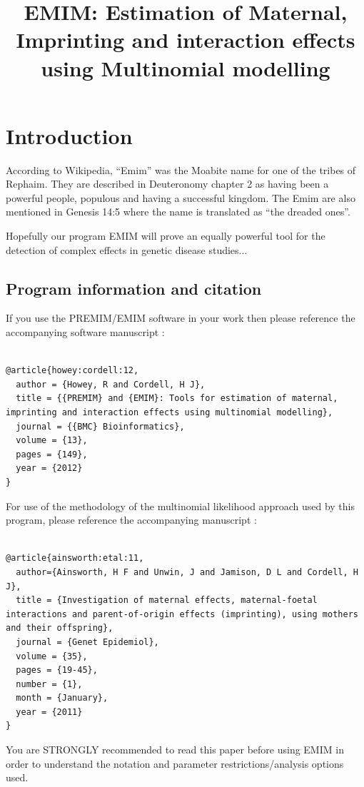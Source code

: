 \documentclass[a4paper,12pt]{article}
\begin{document}
\title{EMIM: Estimation of Maternal, Imprinting and interaction effects using Multinomial modelling}
\date{}
\author{}
\maketitle
\newpage
\tableofcontents
\newpage
\section{Introduction}
\label{introduction}

According to Wikipedia, ``Emim'' was the Moabite name for one of the tribes of Rephaim. They are described in Deuteronomy chapter 2 as having been a powerful people, populous and having a successful kingdom. The Emim are also mentioned in Genesis 14:5 where the name is translated as ``the dreaded ones''. 

Hopefully our program EMIM will prove an equally powerful tool for the detection of complex effects in genetic disease studies... 
\subsection{Program information and citation}
\label{information}

If you use the PREMIM/EMIM software in your work then please reference the accompanying software manuscript \citet{howey:cordell:12}: 
\vspace{0.35cm} \begin{lstlisting}

@article{howey:cordell:12,
  author = {Howey, R and Cordell, H J},
  title = {{PREMIM} and {EMIM}: Tools for estimation of maternal, imprinting and interaction effects using multinomial modelling},
  journal = {{BMC} Bioinformatics},
  volume = {13},
  pages = {149},
  year = {2012}
}              

\end{lstlisting} \vspace{0.35cm}
For use of the methodology of the multinomial likelihood approach used by this program, please reference the accompanying manuscript \citet{ainsworth:etal:11}: 
\vspace{0.35cm} \begin{lstlisting}

@article{ainsworth:etal:11,
  author={Ainsworth, H F and Unwin, J and Jamison, D L and Cordell, H J},
  title = {Investigation of maternal effects, maternal-foetal interactions and parent-of-origin effects (imprinting), using mothers and their offspring},
  journal = {Genet Epidemiol},
  volume = {35},
  pages = {19-45},
  number = {1},
  month = {January},
  year = {2011}
}

\end{lstlisting} \vspace{0.35cm}
You are STRONGLY recommended to read this paper before using EMIM in order to understand the notation and parameter restrictions/analysis options used. 
\end{document}
